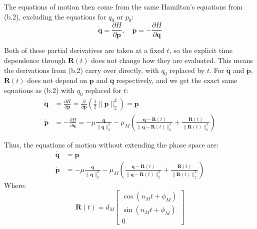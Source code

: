 \documentclass[titlepage]{article}
\begin{document}
The equations of motion then come from the same Hamilton's equations from (b.2), excluding the equations for $q_0$ or $p_0$:
\begin{equation}
	\dot{\boldsymbol{q}}=\frac{\partial H}{\partial\boldsymbol{p}},\quad\dot{\boldsymbol{p}}=-\frac{\partial H}{\partial\boldsymbol{q}}
\end{equation}

Both of these partial derivatives are taken at a fixed $t$, so the explicit time dependence through $\boldsymbol{R}(t)$ does not change how they are evaluated. This means the derivations from (b.2) carry over directly, with $q_0$ replaced by $t$. For $\dot{\boldsymbol{q}}$ and $\dot{\boldsymbol{p}}$, $\boldsymbol{R}(t)$ does not depend on $\boldsymbol{p}$ and $\boldsymbol{q}$ respectively, and we get the exact same equations as (b.2) with $q_0$ replaced for $t$:
\begin{equation}
	\begin{split}
		\dot{\boldsymbol{q}}&=\frac{\partial H}{\partial\boldsymbol{p}}=\frac{\partial}{\partial\boldsymbol{p}}\left(\frac{1}{2}\|\boldsymbol{p}\|_2^2\right)=\boldsymbol{p} \\
		\dot{\boldsymbol{p}}&=-\frac{\partial H}{\partial\boldsymbol{q}}=-\mu\frac{\boldsymbol{q}}{\|\boldsymbol{q}\|_2^3}-\mu_M\left(\frac{\boldsymbol{q}-\boldsymbol{R}(t)}{\|\boldsymbol{q}-\boldsymbol{R}(t)\|_2^3}+\frac{\boldsymbol{R}(t)}{\|\boldsymbol{R}(t)\|_2^3}\right)
	\end{split}
\end{equation}

\begin{mdframed}[linewidth=1pt, innertopmargin=10pt, innerbottommargin=10pt]
	Thus, the equations of motion without extending the phase space are:
	\begin{equation}
		\begin{split}
			\dot{\boldsymbol{q}}&=\boldsymbol{p} \\
			\dot{\boldsymbol{p}}&=-\mu\frac{\boldsymbol{q}}{\|\boldsymbol{q}\|_2^3}-\mu_M\left(\frac{\boldsymbol{q}-\boldsymbol{R}(t)}{\|\boldsymbol{q}-\boldsymbol{R}(t)\|_2^3}+\frac{\boldsymbol{R}(t)}{\|\boldsymbol{R}(t)\|_2^3}\right)
		\end{split}
	\end{equation}
	Where:
	\begin{equation}
		\boldsymbol{R}(t)=d_M
		\begin{bmatrix}
			\cos(n_Mt+\phi_M) \\
			\sin(n_Mt+\phi_M) \\
			0
		\end{bmatrix}
	\end{equation}
\end{mdframed}
\end{document}
